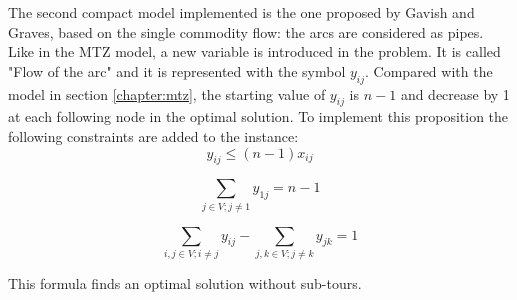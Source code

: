 The second compact model implemented is the one proposed by Gavish and Graves, based on the single commodity flow:  the arcs are considered as pipes.\\
Like in the MTZ model, a new variable is introduced in the problem. It is called "Flow of the arc" and it is represented with the symbol $y_{ij}$. Compared with the model in section \ref{chapter:mtz}, the starting value of $y_{ij}$ is $n-1$ and decrease by 1 at each following node in the optimal solution. 
To implement this proposition the following constraints are added to the instance:
\begin{equation}
\label{eqn:linking}
y_{ij}\le (n-1)x_{ij}
\end{equation}

\begin{equation}
\label{eqn:flow_first}
\sum_{j\in V;j\not=1}y_{1j}=n-1
\end{equation}

\begin{equation}
\label{eqn:flows}
\sum_{i, j\in V;i\not=j}y_{ij}-\sum_{j, k \in V;j\not=k}y_{jk}=1
\end{equation}


This formula finds an optimal solution without sub-tours.
